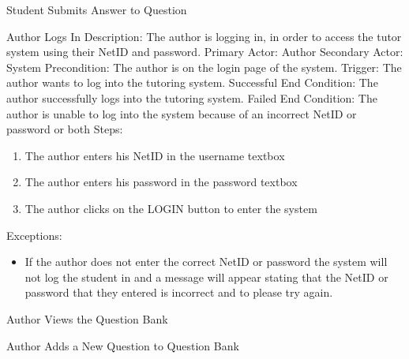 \begin{section}{Student Submits Answer to Question}
    \begin{section}{Author Logs In}
        Description: The author is logging in, in order to access the tutor system using their NetID and password. \newline
        Primary Actor: Author \newline
        Secondary Actor: System \newline
        Precondition: The author is on the login page of the system. \newline
        Trigger: The author wants to log into the tutoring system. \newline
        Successful End Condition: The author successfully logs into the tutoring system. \newline
        Failed End Condition:  The author is unable to log into the system because of an incorrect NetID or password or both \newline
        \newline
        Steps:
        \begin{enumerate}
            \item{The author enters his NetID in the username textbox}
            \item{The author enters his password in the password textbox}
            \item{The author clicks on the LOGIN button to enter the system}
        \end{enumerate}
        Exceptions:
        \begin{itemize}
            \item{If the author does not enter the correct NetID or password 
            the system will not log the student in and a message will appear stating 
            that the NetID or password that they entered is incorrect and to please try again.}
        \end{itemize}
    \end{section}
  
  
    
    \begin{section}{Author Views the Question Bank}
    
    \end{section}
    
    
    
    \begin{section}{Author Adds a New Question to Question Bank}
    
    \end{section}
    

\end{section}
